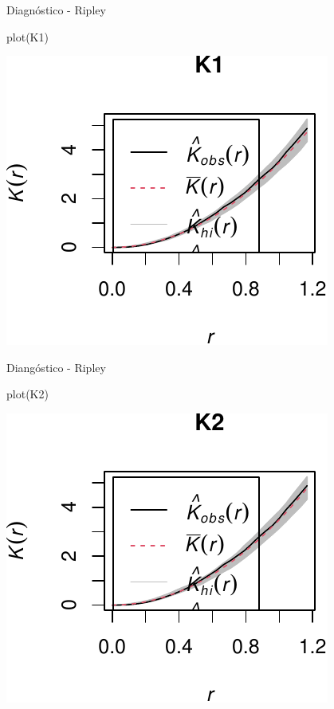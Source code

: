 \documentclass[
  11pt,
  ignorenonframetext,
]{beamer}
\newenvironment{Shaded}{}{}
\newcommand{\FunctionTok}[1]{\textcolor[rgb]{0.02,0.16,0.49}{#1}}
\newcommand{\NormalTok}[1]{#1}
\begin{document}
\begin{frame}[fragile]{Diagnóstico - Ripley}
\protect\hypertarget{diagnuxf3stico---ripley-1}{}
\begin{Shaded}
\begin{Highlighting}[]
\FunctionTok{plot}\NormalTok{(K1)}
\end{Highlighting}
\end{Shaded}

\begin{center}\includegraphics{Tutorial-spatstat-2_files/figure-beamer/unnamed-chunk-20-1} \end{center}
\end{frame}

\begin{frame}[fragile]{Diangóstico - Ripley}
\protect\hypertarget{dianguxf3stico---ripley}{}
\begin{Shaded}
\begin{Highlighting}[]
\FunctionTok{plot}\NormalTok{(K2)}
\end{Highlighting}
\end{Shaded}

\begin{center}\includegraphics{Tutorial-spatstat-2_files/figure-beamer/unnamed-chunk-21-1} \end{center}
\end{frame}
\end{document}
